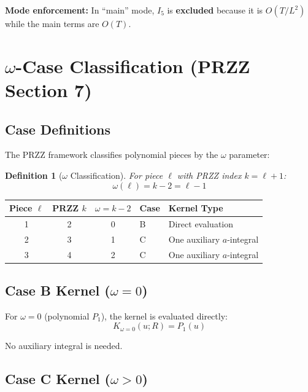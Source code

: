 \documentclass[11pt]{article}
\newtheorem{definition}{Definition}
\begin{document}
\textbf{Mode enforcement:} In ``main'' mode, $I_5$ is \textbf{excluded} because it is $O(T/L^2)$ while the main terms are $O(T)$.

\section{$\omega$-Case Classification (PRZZ Section 7)}
\label{sec:omega}

\subsection{Case Definitions}

The PRZZ framework classifies polynomial pieces by the $\omega$ parameter:

\begin{definition}[$\omega$ Classification]
For piece $\ell$ with PRZZ index $k = \ell + 1$:
\begin{equation}
\omega(\ell) = k - 2 = \ell - 1
\end{equation}
\end{definition}

\begin{center}
\begin{tabular}{cccll}
\toprule
Piece $\ell$ & PRZZ $k$ & $\omega = k-2$ & Case & Kernel Type \\
\midrule
1 & 2 & 0 & B & Direct evaluation \\
2 & 3 & 1 & C & One auxiliary $a$-integral \\
3 & 4 & 2 & C & One auxiliary $a$-integral \\
\bottomrule
\end{tabular}
\end{center}

\subsection{Case B Kernel ($\omega = 0$)}

For $\omega = 0$ (polynomial $P_1$), the kernel is evaluated directly:
\begin{equation}
K_{\omega=0}(u; R) = P_1(u)
\end{equation}

No auxiliary integral is needed.

\subsection{Case C Kernel ($\omega > 0$)}
\end{document}
